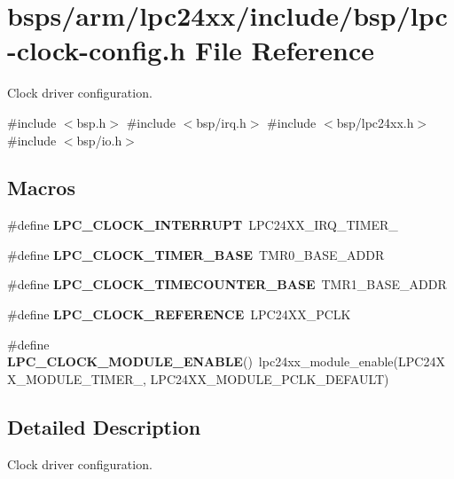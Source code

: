 \hypertarget{lpc24xx_2include_2bsp_2lpc-clock-config_8h}{}\section{bsps/arm/lpc24xx/include/bsp/lpc-\/clock-\/config.h File Reference}
\label{lpc24xx_2include_2bsp_2lpc-clock-config_8h}


Clock driver configuration.  


{\ttfamily \#include $<$bsp.\+h$>$}\newline
{\ttfamily \#include $<$bsp/irq.\+h$>$}\newline
{\ttfamily \#include $<$bsp/lpc24xx.\+h$>$}\newline
{\ttfamily \#include $<$bsp/io.\+h$>$}\newline
\subsection*{Macros}
\begin{DoxyCompactItemize}
\item 
\mbox{\label{lpc24xx_2include_2bsp_2lpc-clock-config_8h_ac1220f34104208e6ff5cfdd6b398aba8}} 
\#define {\bfseries L\+P\+C\+\_\+\+C\+L\+O\+C\+K\+\_\+\+I\+N\+T\+E\+R\+R\+U\+PT}~L\+P\+C24\+X\+X\+\_\+\+I\+R\+Q\+\_\+\+T\+I\+M\+E\+R\+\_
\item 
\mbox{\label{lpc24xx_2include_2bsp_2lpc-clock-config_8h_ab76011fa470983732aa4646723ff94f5}} 
\#define {\bfseries L\+P\+C\+\_\+\+C\+L\+O\+C\+K\+\_\+\+T\+I\+M\+E\+R\+\_\+\+B\+A\+SE}~T\+M\+R0\+\_\+\+B\+A\+S\+E\+\_\+\+A\+D\+DR
\item 
\mbox{\label{lpc24xx_2include_2bsp_2lpc-clock-config_8h_ac46820b8bec32680b474d61bebb1b7d1}} 
\#define {\bfseries L\+P\+C\+\_\+\+C\+L\+O\+C\+K\+\_\+\+T\+I\+M\+E\+C\+O\+U\+N\+T\+E\+R\+\_\+\+B\+A\+SE}~T\+M\+R1\+\_\+\+B\+A\+S\+E\+\_\+\+A\+D\+DR
\item 
\mbox{\label{lpc24xx_2include_2bsp_2lpc-clock-config_8h_addc938908b1ed7eb314ba94b0cf188ef}} 
\#define {\bfseries L\+P\+C\+\_\+\+C\+L\+O\+C\+K\+\_\+\+R\+E\+F\+E\+R\+E\+N\+CE}~L\+P\+C24\+X\+X\+\_\+\+P\+C\+LK
\item 
\mbox{\label{lpc24xx_2include_2bsp_2lpc-clock-config_8h_a9e10fd86cae2310ffaee1a8478d35cd0}} 
\#define {\bfseries L\+P\+C\+\_\+\+C\+L\+O\+C\+K\+\_\+\+M\+O\+D\+U\+L\+E\+\_\+\+E\+N\+A\+B\+LE}()~lpc24xx\+\_\+module\+\_\+enable(L\+P\+C24\+X\+X\+\_\+\+M\+O\+D\+U\+L\+E\+\_\+\+T\+I\+M\+E\+R\+\_, L\+P\+C24\+X\+X\+\_\+\+M\+O\+D\+U\+L\+E\+\_\+\+P\+C\+L\+K\+\_\+\+D\+E\+F\+A\+U\+LT)
\end{DoxyCompactItemize}


\subsection{Detailed Description}
Clock driver configuration. 

